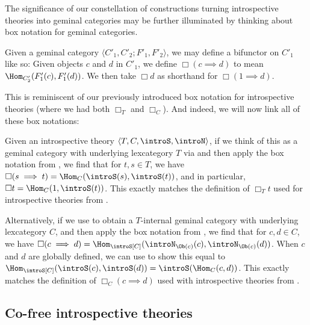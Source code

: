 The significance of our constellation of constructions turning introspective theories into geminal categories may be further illuminated by thinking about box notation for geminal categories.

\begin{definition}\label{BoxForGeminal}
Given a geminal category $\langle C'_1, C'_2; F'_1, F'_2 \rangle$, we may define a bifunctor on $C'_1$ like so: Given objects $c$ and $d$ in $C'_1$, we define $\Box(c \implies d)$ to mean $\Hom_{C'_2}(F'_1(c), F'_1(d))$. We then take $\Box d$ as shorthand for $\Box(1 \implies d)$.
\end{definition}

This is reminiscent of our previously introduced box notation for introspective theories (where we had both $\Box_T$ and $\Box_C$). And indeed, we will now link all of these box notations:

\begin{observation}
Given an introspective theory $\langle T, C, \introS, \introN \rangle$, if we think of this as a geminal category with underlying lexcategory $T$ via  and then apply the box notation from , we find that for $t, s \in T$, we have $\Box(s \implies t) = \Hom_C(\introS(s), \introS(t))$, and in particular, $\Box t = \Hom_C(1, \introS(t))$. This exactly matches the definition of $\Box_T t$ used for introspective theories from .

Alternatively, if we use  to obtain a $T$-internal geminal category with underlying lexcategory $C$, and then apply the box notation from , we find that for $c, d \in C$, we have $\Box(c \implies d) = \Hom_{\introS[C]}(\introN_{\Ob(c)}(c), \introN_{\Ob(c)}(d))$. When $c$ and $d$ are globally defined, we can use  to show this equal to $\Hom_{\introS[C]}(\introS(c), \introS(d)) =  \introS(\Hom_C(c, d))$. This exactly matches the definition of $\Box_C (c \implies d)$ used with introspective theories from .

\end{observation}


\subsection{Co-free introspective theories}

